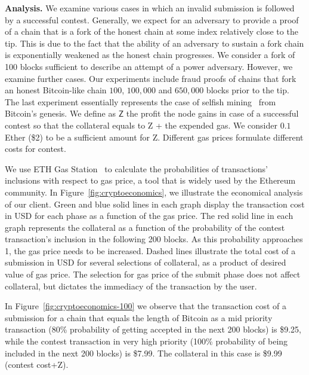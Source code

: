 \noindent \textbf{Analysis.} We examine various cases in which an invalid
submission is followed by a successful contest. Generally, we expect for an
adversary to provide a proof of a chain that is a fork of the honest chain at
some index relatively close to the tip. This is due to the fact that the
ability of an adversary to sustain a fork chain is exponentially weakened as
the honest chain progresses. We consider a fork of 100 blocks sufficient to
describe an attempt of a power adversary. However, we examine further cases.
Our experiments include fraud proofs of chains that fork an honest Bitcoin-like
chain $100$, $100{,}000$ and $650{,}000$ blocks prior to the tip. The last
experiment essentially represents the case of selfish mining~\cite{selfish}
from Bitcoin's genesis. We define as $\textsf{Z}$ the profit the node gains in
case of a successful contest so that the collateral equals to \textsf{Z} + the
expended gas. We consider $0.1$ Ether (\$2) to be a sufficient amount for
\textsf{Z}. Different gas prices formulate different costs for contest.

We use ETH Gas Station~\cite{eth-gas-station} to calculate the probabilities of
transactions' inclusions with respect to gas price, a tool that is widely used
by the Ethereum community. In Figure~\ref{fig:cryptoeconomics}, we illustrate
the economical analysis of our client. Green and blue solid lines in each graph
display the transaction cost in USD for each phase as a function of the gas
price. The red solid line in each graph represents the collateral as a function
of the probability of the contest transaction's inclusion in the following 200
blocks. As this probability approaches 1, the gas price needs to be increased.
Dashed lines illustrate the total cost of a submission in USD for several
selections of collateral, as a product of desired value of gas price. The
selection for gas price of the submit phase does not affect collateral, but
dictates the immediacy of the transaction by the user.

In Figure~\ref{fig:cryptoeconomics-100} we observe that the transaction cost of
a submission for a chain that equals the length of Bitcoin as a mid priority
transaction (80\% probability of getting accepted in the next 200 blocks) is
\$9.25, while the contest transaction in very high priority (100\% probability
of being included in the next 200 blocks) is \$7.99. The collateral in this
case is \$9.99 (contest cost+\textsf{Z}).

